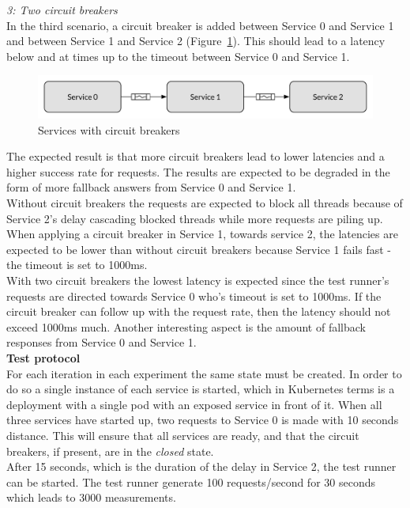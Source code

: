 \noindent
\textit{3: Two circuit breakers}
\\
In the third scenario, a circuit breaker is added between Service 0 and Service 1 and between Service 1 and Service 2 (Figure~\ref{fig:exp2_circuit_breaker}). This should lead to a latency below and at times up to the timeout between Service 0 and Service 1.
\begin{figure}[H]
\centering
\includegraphics[scale=0.5]{figures/circuit_breaker_3_services}
\caption{Services with circuit breakers}
\label{fig:exp2_circuit_breaker}
\end{figure}

\noindent 

\noindent The expected result is that more circuit breakers lead to lower latencies and a higher success rate for requests. The results are expected to be degraded in the form of more fallback answers from Service 0 and Service 1. \\

\noindent Without circuit breakers the requests are expected to block all threads because of Service 2's delay cascading blocked threads while more requests are piling up. \\

\noindent When applying a circuit breaker in Service 1, towards service 2, the latencies are expected to be lower than without circuit breakers because Service 1 fails fast - the timeout is set to 1000ms. \\

\noindent With two circuit breakers the lowest latency is expected since the test runner's requests are directed towards Service 0 who's timeout is set to 1000ms. If the circuit breaker can follow up with the request rate, then the latency should not exceed 1000ms much. Another interesting aspect is the amount of fallback responses from Service 0 and Service 1. \\

\noindent
\textbf{Test protocol}
\\
For each iteration in each experiment the same state must be created. In order to do so a single instance of each service is started, which in Kubernetes terms is a deployment with a single pod with an exposed service in front of it. When all three services have started up, two requests to Service 0 is made with 10 seconds distance. This will ensure that all services are ready, and that the circuit breakers, if present, are in the \textit{closed} state. \\
After 15 seconds, which is the duration of the delay in Service 2, the test runner can be started. The test runner generate 100 requests/second for 30 seconds which leads to 3000 measurements.\\

